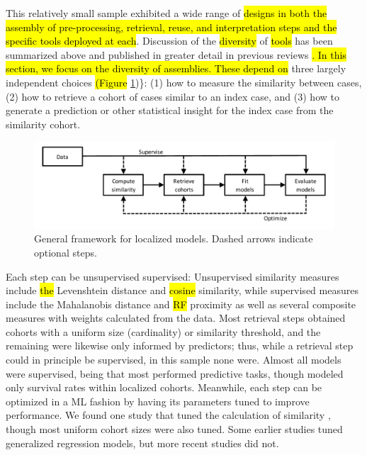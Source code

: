 \documentclass[sn-mathphys,Numbered,pdflatex]{sn-jnl}
\theoremstyle{remark}
\theoremstyle{definition}
\begin{document}
This relatively small sample exhibited a wide range of
\hl{designs in both the assembly of pre-processing, retrieval, reuse, and interpretation steps and the specific tools deployed at each}.
Discussion of the \hl{diversity} of \hl{tools} has been summarized above
and published in greater detail in previous reviews
\citep{Choudhury2016, Sharafoddini2017, Parimbelli2018}\hl{. In this section, we focus on the diversity of assemblies. These depend on}
three largely independent choices
\hl{(Figure }\ref{fig:framework}\hl{})\}: (1) how to measure the
similarity between cases, (2) how to retrieve a cohort of cases similar
to an index case, and (3) how to generate a prediction or other
statistical insight for the index case from the similarity cohort.

\begin{figure}

{\centering \includegraphics[width=1\linewidth]{Fig5} 

}

\caption{General framework for localized models.
 Dashed arrows indicate optional steps.}\label{fig:framework}
\end{figure}

Each step can be unsupervised supervised: Unsupervised similarity
measures include \hl{the} Levenshtein distance and \hl{cosine}
similarity, while supervised measures include the Mahalanobis distance
and \hl{RF} proximity as well as several composite measures with weights
calculated from the data. Most retrieval steps obtained cohorts with a
uniform size (cardinality) or similarity threshold, and the remaining
were likewise only informed by predictors; thus, while a retrieval step
could in principle be supervised, in this sample none were. Almost all
models were supervised, being that most performed predictive tasks,
though \citet{Mariuzzi1997} modeled only survival rates within localized
cohorts. Meanwhile, each step can be optimized in a ML fashion by having
its parameters tuned to improve performance. We found one study that
tuned the calculation of similarity \citep{Liu2022}, though most uniform
cohort sizes were also tuned. Some earlier studies tuned generalized
regression models, but more recent studies did not.
\end{document}

